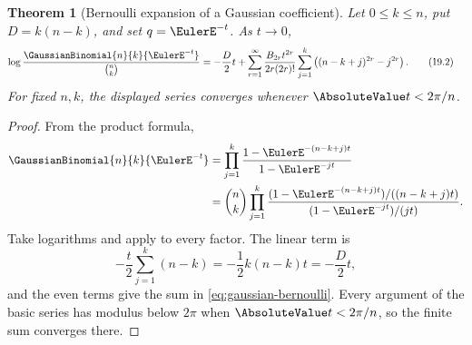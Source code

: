 \documentclass[11pt,a4paper,oneside,openany]{book}
\newtheorem{theorem}{Theorem}[chapter]
\theoremstyle{definition}
\theoremstyle{remark}
\begin{document}
\begin{theorem}[Bernoulli expansion of a Gaussian coefficient]\label{thm:gaussian-bernoulli}
Let $0\le k\le n$, put $D=k(n-k)$, and set $q=\EulerE^{-t}$.  As $t\to0$,
\begin{align}
 \log\frac{\GaussianBinomial{n}{k}{\EulerE^{-t}}}{\binom nk}
 =-&\frac D2t
 +\sum_{r=1}^{\infty}
 \frac{B_{2r}t^{2r}}{2r(2r)!}
 \sum_{j=1}^{k}
 \left((n-k+j)^{2r}-j^{2r}\right).
 \tag{19.2}\label{eq:gaussian-bernoulli}
\end{align}
For fixed $n,k$, the displayed series converges whenever $\AbsoluteValue t<2\pi/n$.
\end{theorem}

\begin{proof}
From the product formula,
\begin{align*}
 \GaussianBinomial{n}{k}{\EulerE^{-t}}
 &=\prod_{j=1}^{k}
 \frac{1-\EulerE^{-(n-k+j)t}}{1-\EulerE^{-jt}}\\
 &=\binom nk
 \prod_{j=1}^{k}
 \frac{(1-\EulerE^{-(n-k+j)t})/((n-k+j)t)}
      {(1-\EulerE^{-jt})/(jt)}.
\end{align*}
Take logarithms and apply  to every factor.  The linear term is
\[
 -\frac t2\sum_{j=1}^{k}(n-k)=-\frac12k(n-k)t=-\frac D2t,
\]
and the even terms give the sum in \eqref{eq:gaussian-bernoulli}.  Every argument of the basic series has modulus below $2\pi$ when $\AbsoluteValue t<2\pi/n$, so the finite sum converges there.
\end{proof}
\end{document}
